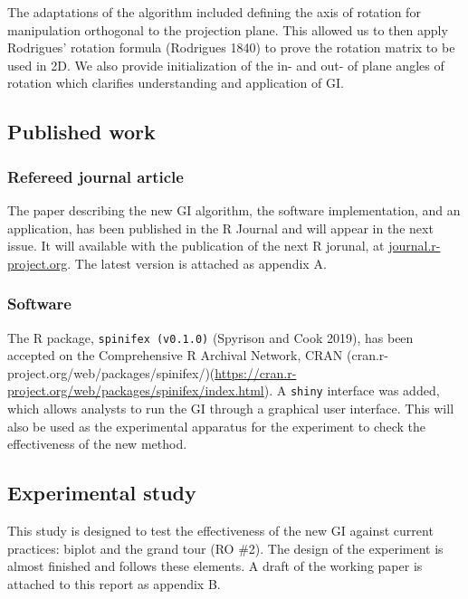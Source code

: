 \documentclass[
  11,
]{article}
\begin{document}
The adaptations of the algorithm included defining the axis of rotation for manipulation orthogonal to the projection plane. This allowed us to then apply Rodrigues' rotation formula (Rodrigues 1840) to prove the rotation matrix to be used in 2D. We also provide initialization of the in- and out- of plane angles of rotation which clarifies understanding and application of GI.

\hypertarget{published-work}{%
\subsection{Published work}\label{published-work}}

\hypertarget{refereed-journal-article}{%
\subsubsection{Refereed journal article}\label{refereed-journal-article}}

The paper describing the new GI algorithm, the software implementation, and an application, has been published in the R Journal and will appear in the next issue. It will available with the publication of the next R jorunal, at \href{https://journal.r-project.org/}{journal.r-project.org}. The latest version is attached as appendix A.

\hypertarget{software}{%
\subsubsection{Software}\label{software}}

The R package, \texttt{spinifex\ (v0.1.0)} (Spyrison and Cook 2019), has been accepted on the Comprehensive R Archival Network, CRAN (cran.r-project.org/web/packages/spinifex/)(\url{https://cran.r-project.org/web/packages/spinifex/index.html}). A \texttt{shiny} interface was added, which allows analysts to run the GI through a graphical user interface. This will also be used as the experimental apparatus for the experiment to check the effectiveness of the new method.

\hypertarget{sec:expStudy}{%
\subsection{Experimental study}\label{sec:expStudy}}

This study is designed to test the effectiveness of the new GI against current practices: biplot and the grand tour (RO \#2). The design of the experiment is almost finished and follows these elements. A draft of the working paper is attached to this report as appendix B.
\end{document}
